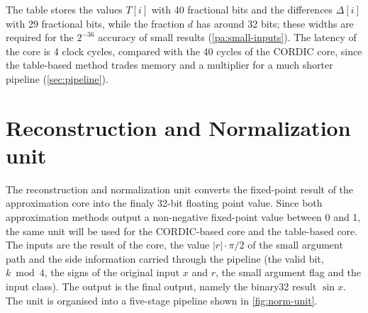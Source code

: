 The table stores the values $T[i]$ with 40 fractional bits and the
differences $\Delta[i]$ with 29 fractional bits, while the fraction $d$ has
around 32 bits; these widths are required for the $2^{-36}$ accuracy of small
results (\cref{pa:small-inputs}). The latency of the core is 4 clock cycles,
compared with the 40 cycles of the CORDIC core, since the table-based method
trades memory and a multiplier for a much shorter pipeline
(\cref{sec:pipeline}).

\newpage

\section{Reconstruction and Normalization unit}
\label{sec:reconst-norm-unit}

The reconstruction and normalization unit converts the fixed-point result of the approximation
core into the finaly 32-bit floating point value. Since both approximation methods output a
non-negative fixed-point value between 0 and 1, the same unit will be used for the CORDIC-based
core and the table-based core. The inputs are the result of the core, the value $|r| \cdot \pi/2$
of the small argument path and the side information carried through the pipeline (the valid bit,
$k \bmod 4$, the signs of the original input $x$ and $r$, the small argument flag and the input class).
The output is the final output, namely the binary32 result $\sin x$. The unit is organised into a
five-stage pipeline shown in \cref{fig:norm-unit}.

